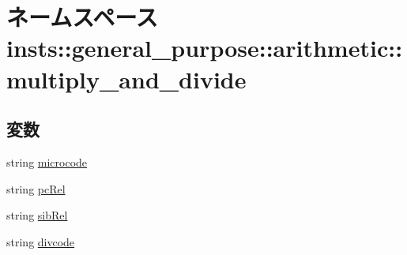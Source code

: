 \hypertarget{namespaceinsts_1_1general__purpose_1_1arithmetic_1_1multiply__and__divide}{
\section{ネームスペース insts::general\_\-purpose::arithmetic::multiply\_\-and\_\-divide}
\label{namespaceinsts_1_1general__purpose_1_1arithmetic_1_1multiply__and__divide}
}
\subsection*{変数}
\begin{DoxyCompactItemize}
\item 
string \hyperlink{namespaceinsts_1_1general__purpose_1_1arithmetic_1_1multiply__and__divide_a770f11a173e99389a8802f0107ed8f52}{microcode}
\item 
string \hyperlink{namespaceinsts_1_1general__purpose_1_1arithmetic_1_1multiply__and__divide_a53602c75f8ee246158cefec1f1817374}{pcRel}
\item 
string \hyperlink{namespaceinsts_1_1general__purpose_1_1arithmetic_1_1multiply__and__divide_aeea35330578887251a542674b0ef6f53}{sibRel}
\item 
string \hyperlink{namespaceinsts_1_1general__purpose_1_1arithmetic_1_1multiply__and__divide_ae7e0abb7d464af1d5f77999ed3ea7846}{divcode}
\end{DoxyCompactItemize}


